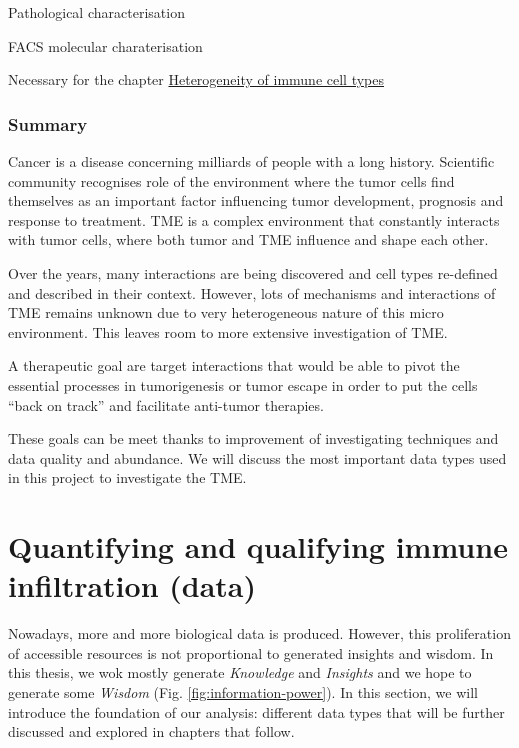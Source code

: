\documentclass[12pt,]{book}
\theoremstyle{definition}
\theoremstyle{definition}
\theoremstyle{definition}
\theoremstyle{remark}
\begin{document}
Pathological characterisation

FACS molecular charaterisation

Necessary for the chapter \protect\hyperlink{map}{Heterogeneity of
immune cell types}

\hypertarget{summary}{%
\subsubsection{Summary}\label{summary}}

Cancer is a disease concerning milliards of people with a long history.
Scientific community recognises role of the environment where the tumor
cells find themselves as an important factor influencing tumor
development, prognosis and response to treatment. TME is a complex
environment that constantly interacts with tumor cells, where both tumor
and TME influence and shape each other.

Over the years, many interactions are being discovered and cell types
re-defined and described in their context. However, lots of mechanisms
and interactions of TME remains unknown due to very heterogeneous nature
of this micro environment. This leaves room to more extensive
investigation of TME.

A therapeutic goal are target interactions that would be able to pivot
the essential processes in tumorigenesis or tumor escape in order to put
the cells ``back on track'' and facilitate anti-tumor therapies.

These goals can be meet thanks to improvement of investigating
techniques and data quality and abundance. We will discuss the most
important data types used in this project to investigate the TME.

\hypertarget{quantifying-and-qualifying-immune-infiltration-data}{%
\section{Quantifying and qualifying immune infiltration
(data)}\label{quantifying-and-qualifying-immune-infiltration-data}}

Nowadays, more and more biological data is produced. However, this
proliferation of accessible resources is not proportional to generated
insights and wisdom. In this thesis, we wok mostly generate
\emph{Knowledge} and \emph{Insights} and we hope to generate some
\emph{Wisdom} (Fig. \ref{fig:information-power}). In this section, we
will introduce the foundation of our analysis: different data types that
will be further discussed and explored in chapters that follow.
\end{document}
